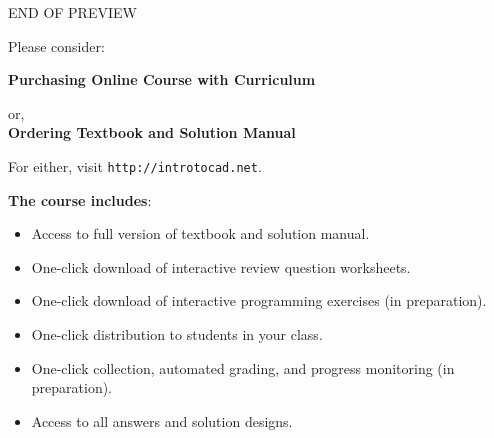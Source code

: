 \documentclass{article}
\newif\iffullversion
\begin{document}
\newpage
\iffullversion
\else
\vbox{}
\vfill
\pagestyle{empty}
    \begin{center}
    {\huge \color{red}END OF PREVIEW}\\[2cm]

\centerline{\Large Please consider:}
\vspace{1cm}

{\Large \bf Purchasing Online Course with Curriculum}
\vspace{1cm}

    {\Large or,}\\[1cm]

{\Large \bf Ordering Textbook and Solution Manual}
\vspace{1cm}

    {\Large For either, visit {\tt http://introtocad.net}. \\[2cm]
}
\end{center}
{\bf The course includes}:
\begin{itemize}
\item Access to full version of textbook and solution manual.
\item One-click download of interactive review question worksheets.
\item One-click download of interactive programming exercises (in preparation).
\item One-click distribution to students in your class.
\item One-click collection, automated grading, and progress monitoring (in preparation).
\item Access to all answers and solution designs.
\end{itemize}

\vfill
    
\end{document}
